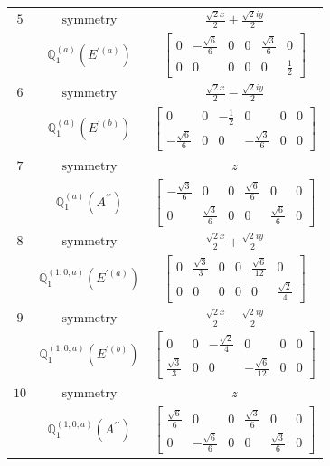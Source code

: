 \documentclass[fleqn,8pt,landscape]{jsarticle}
\begin{document}
\begin{longtable}{ccc}
$ 5 $ & $ \text{symmetry} $ & $ \frac{\sqrt{2} x}{2} + \frac{\sqrt{2} i y}{2} $ \\
$  $ & $ \mathbb{Q}_{1}^{(a)}(E^{\prime(a)}) $ & $ \begin{bmatrix} 0 & - \frac{\sqrt{6}}{6} & 0 & 0 & \frac{\sqrt{3}}{6} & 0 \\ 0 & 0 & 0 & 0 & 0 & \frac{1}{2} \end{bmatrix} $ \\ \hline
$ 6 $ & $ \text{symmetry} $ & $ \frac{\sqrt{2} x}{2} - \frac{\sqrt{2} i y}{2} $ \\
$  $ & $ \mathbb{Q}_{1}^{(a)}(E^{\prime(b)}) $ & $ \begin{bmatrix} 0 & 0 & - \frac{1}{2} & 0 & 0 & 0 \\ - \frac{\sqrt{6}}{6} & 0 & 0 & - \frac{\sqrt{3}}{6} & 0 & 0 \end{bmatrix} $ \\ \hline
$ 7 $ & $ \text{symmetry} $ & $ z $ \\
$  $ & $ \mathbb{Q}_{1}^{(a)}(A^{\prime\prime}) $ & $ \begin{bmatrix} - \frac{\sqrt{3}}{6} & 0 & 0 & \frac{\sqrt{6}}{6} & 0 & 0 \\ 0 & \frac{\sqrt{3}}{6} & 0 & 0 & \frac{\sqrt{6}}{6} & 0 \end{bmatrix} $ \\ \hline
$ 8 $ & $ \text{symmetry} $ & $ \frac{\sqrt{2} x}{2} + \frac{\sqrt{2} i y}{2} $ \\
$  $ & $ \mathbb{Q}_{1}^{(1,0;a)}(E^{\prime(a)}) $ & $ \begin{bmatrix} 0 & \frac{\sqrt{3}}{3} & 0 & 0 & \frac{\sqrt{6}}{12} & 0 \\ 0 & 0 & 0 & 0 & 0 & \frac{\sqrt{2}}{4} \end{bmatrix} $ \\ \hline
$ 9 $ & $ \text{symmetry} $ & $ \frac{\sqrt{2} x}{2} - \frac{\sqrt{2} i y}{2} $ \\
$  $ & $ \mathbb{Q}_{1}^{(1,0;a)}(E^{\prime(b)}) $ & $ \begin{bmatrix} 0 & 0 & - \frac{\sqrt{2}}{4} & 0 & 0 & 0 \\ \frac{\sqrt{3}}{3} & 0 & 0 & - \frac{\sqrt{6}}{12} & 0 & 0 \end{bmatrix} $ \\ \hline
$ 10 $ & $ \text{symmetry} $ & $ z $ \\
$  $ & $ \mathbb{Q}_{1}^{(1,0;a)}(A^{\prime\prime}) $ & $ \begin{bmatrix} \frac{\sqrt{6}}{6} & 0 & 0 & \frac{\sqrt{3}}{6} & 0 & 0 \\ 0 & - \frac{\sqrt{6}}{6} & 0 & 0 & \frac{\sqrt{3}}{6} & 0 \end{bmatrix} $ \\ \hline

\end{longtable}
\end{document}
